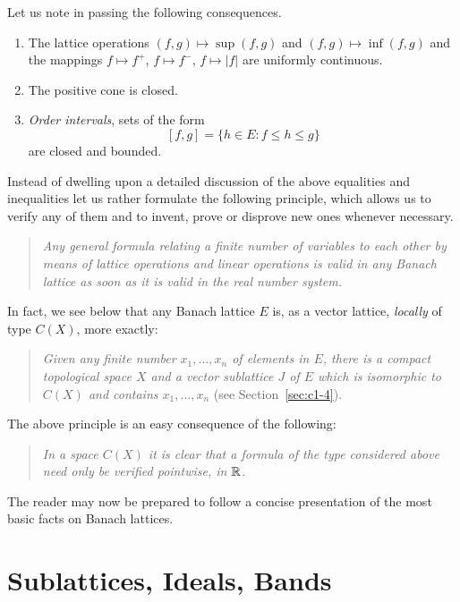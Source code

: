 Let us note in passing the following consequences.
%
\begin{enumerate}[\upshape (i)]
\item 
The lattice operations $ (f,g) \mapsto \sup(f,g) $ and $ (f,g) \mapsto \inf(f,g) $ and the mappings $ f \mapsto f^{+} $, $ f \mapsto f^{-} $, $ f \mapsto |f| $ are uniformly continuous.

\item 
The positive cone is closed.

\item 
\emph{Order intervals}, \ie sets of the form
\[
	\left[ f,g \right] = \{ h \in E \colon f \leq h \leq g \}
\]
are closed and bounded.
\end{enumerate}
Instead of dwelling upon a detailed discussion of the above equalities and inequalities let us rather formulate the following principle, which allows us to verify any of them and to invent, prove or disprove new ones whenever necessary.
\begin{quote}
\textit{Any general formula relating a finite number of \emph{variables} to each other by means of lattice operations and linear operations is valid in any Banach lattice as soon as it is valid in the real number system.} 
\end{quote}
In fact, we see below that any Banach lattice $ E $ is, as a vector lattice, \emph{locally} of type $ C(X) $, more exactly:
\begin{quote}
\textit{Given any finite number $ x_{1},\ldots, x_{n} $ of elements in $ E $, there is a compact topological space $ X $ and a vector sublattice $ J $ of\/ $ E $ which is isomorphic to $ C(X) $ and contains $ x_{1},\ldots,x_{n} $} (see Section~\ref{sec:c1-4}).
\end{quote}
The above principle is an easy consequence of the following:
\begin{quote}
\textit{In a space $ C(X) $ it is clear that a formula of the type considered above need only be verified pointwise, \ie  in $ \mathbb{R} $.}
\end{quote}
The reader may now be prepared to follow a concise presentation of the most basic facts on Banach lattices.
\section{Sublattices, Ideals, Bands}\label{sec:c1-1}%
%
%

